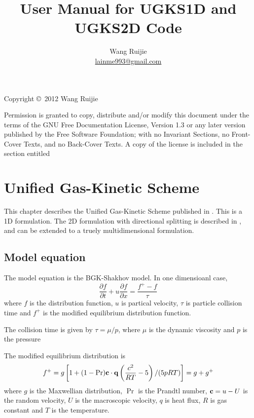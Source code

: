 \documentclass{book}
\begin{document}
\title{User Manual for UGKS1D and UGKS2D Code}
\author{Wang Ruijie\\\href{mailto:lainme993@gmail.com}{lainme993@gmail.com}}
\maketitle

\thispagestyle{empty}
Copyright \copyright\ 2012 Wang Ruijie

Permission is granted to copy, distribute and/or modify this document
under the terms of the GNU Free Documentation License, Version 1.3 or
any later version published by the Free Software Foundation; with no
Invariant Sections, no Front-Cover Texts, and no Back-Cover Texts.  A
copy of the license is included in the section entitled

\frontmatter
\tableofcontents

\mainmatter
\chapter{Unified Gas-Kinetic Scheme}
This chapter describes the Unified Gas-Kinetic Scheme published in \cite{Xu2010,Xu2011}. This is a 1D formulation. The 2D formulation with directional splitting is described in \cite{Huang2012}, and can be extended to a truely multidimensional formulation.
\section{Model equation}
The model equation is the BGK-Shakhov model. In one dimensioanl case,
\begin{equation}
    \frac{\partial f}{\partial t}+u\frac{\partial f}{\partial x}=\frac{f^+-f}{\tau}
\end{equation}
where $f$ is the distribution function, $u$ is partical velocity, $\tau$ is particle collision time and $f^+$ is the modified equilibrium distribution function.

The collision time is given by $\tau=\mu/p$, where $\mu$ is the dynamic viscosity and $p$ is the pressure

The modified equilibrium distribution is
\begin{equation}
    f^+ = g\left[1+(1-\Pr){\bf c}\cdot{\bf q}\left(\frac{c^2}{RT}-5\right)/(5pRT)\right]=g+g^+
\end{equation}
where $g$ is the Maxwellian distribution, $\Pr$ is the Prandtl number, ${\bf c}=u-U$ is the random velocity, $U$ is the macroscopic velocity, $q$ is heat flux, $R$ is gas constant and $T$ is the temperature.
\end{document}
